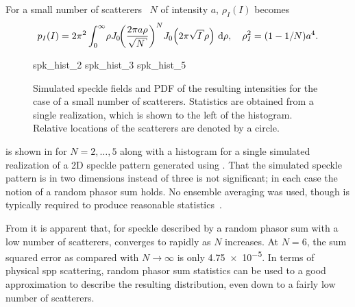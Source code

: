 For a small number of scatterers~\cite{jakeman1984speckle} $N$ of intensity
$a$, $\rho_I(I)$ becomes~\cite{goodman2007speckle}
\begin{equation}
	p_I(I) = 2\pi^2 \int_0^\infty\! \rho J_0\!{\left(\frac{2\pi a
		\rho}{\sqrt{N}}\right)}^N J_0\!\left(2\pi\sqrt{I}\rho\right)\md\rho,\quad \rho_I^2=(1-1/N)a^4.
	\label{eqn:smallscatteqn}
\end{equation}

\begin{figure}[ht]
	\centering
	{spk_hist_2}
	{spk_hist_3}
	{spk_hist_5}
	\caption{Simulated speckle fields and PDF of the resulting intensities for
		the case of a small number of scatterers.  Statistics are obtained from a
		single realization, which is shown to the left of the histogram.  Relative
		locations of the scatterers are denoted by a circle.}
	\label{fig:lowscatthist}
\end{figure}

 is shown in  for
$N=2,\ldots,5$ along with a histogram for a single simulated realization of a
2D speckle pattern generated using .  That the
simulated speckle pattern is in two dimensions instead of three is not
significant; in each case the notion of a random phasor sum holds.  No ensemble
averaging was used, though is typically required to produce reasonable
statistics~\cite{goodman2007speckle}.

From  it is apparent that, for speckle described by a
random phasor sum with a low number of scatterers,
 converges to  rapidly as $N$
increases.  At $N=6$, the sum squared error as compared with $N\to\infty$ is
only \num{4.75e-5}.  In terms of physical \gls{spp} scattering, random phasor sum
statistics can be used to a good approximation to describe the resulting
distribution, even down to a fairly low number of scatterers.
